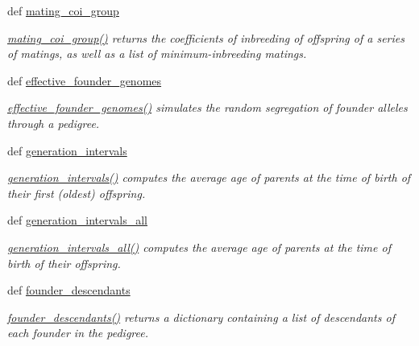 \begin{CompactItemize}
def \hyperlink{namespacePyPedal_1_1pyp__metrics_e051130e25232f609ede648a4dea9986}{mating\_\-coi\_\-group}
\begin{CompactList}\small\item\em \hyperlink{namespacePyPedal_1_1pyp__metrics_e051130e25232f609ede648a4dea9986}{mating\_\-coi\_\-group()} returns the coefficients of inbreeding of offspring of a series of matings, as well as a list of minimum-inbreeding matings. \item\end{CompactList}\item 
def \hyperlink{namespacePyPedal_1_1pyp__metrics_e86f472bfb3705f8a75323d161f6a358}{effective\_\-founder\_\-genomes}
\begin{CompactList}\small\item\em \hyperlink{namespacePyPedal_1_1pyp__metrics_e86f472bfb3705f8a75323d161f6a358}{effective\_\-founder\_\-genomes()} simulates the random segregation of founder alleles through a pedigree. \item\end{CompactList}\item 
def \hyperlink{namespacePyPedal_1_1pyp__metrics_4fc7310e1c6484240ec0571a654cc64a}{generation\_\-intervals}
\begin{CompactList}\small\item\em \hyperlink{namespacePyPedal_1_1pyp__metrics_4fc7310e1c6484240ec0571a654cc64a}{generation\_\-intervals()} computes the average age of parents at the time of birth of their first (oldest) offspring. \item\end{CompactList}\item 
def \hyperlink{namespacePyPedal_1_1pyp__metrics_553d55d2e917b00baf2f02a7cceacd70}{generation\_\-intervals\_\-all}
\begin{CompactList}\small\item\em \hyperlink{namespacePyPedal_1_1pyp__metrics_553d55d2e917b00baf2f02a7cceacd70}{generation\_\-intervals\_\-all()} computes the average age of parents at the time of birth of their offspring. \item\end{CompactList}\item 
def \hyperlink{namespacePyPedal_1_1pyp__metrics_8bb9c8d14721828c6d87bcd0d4e24658}{founder\_\-descendants}
\begin{CompactList}\small\item\em \hyperlink{namespacePyPedal_1_1pyp__metrics_8bb9c8d14721828c6d87bcd0d4e24658}{founder\_\-descendants()} returns a dictionary containing a list of descendants of each founder in the pedigree. \item\end{CompactList}\item 

\end{CompactItemize}
